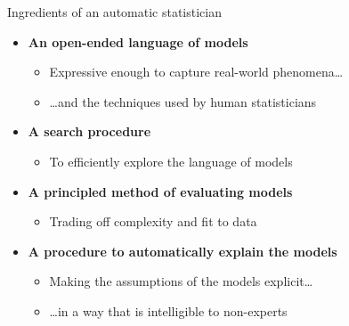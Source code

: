 \begin{frame}{Ingredients of an automatic statistician}
  \begin{center}
    \scalebox{0.5}{}
  \end{center}
  \begin{itemize}
    \footnotesize
    \item {\bf An open-ended language of models}
    \begin{itemize}
       \item Expressive enough to capture real-world phenomena\ldots
       \item \ldots and the techniques used by human statisticians
     \end{itemize}
    \item {\bf A search procedure}
    \begin{itemize}
       \item To efficiently explore the language of models
     \end{itemize}
    \item {\bf A principled method of evaluating models}
    \begin{itemize}
       \item Trading off complexity and fit to data
     \end{itemize}
    \item {\bf A procedure to automatically explain the models}
    \begin{itemize}
       \item Making the assumptions of the models explicit\ldots
       \item \ldots in a way that is intelligible to non-experts
     \end{itemize}
  \end{itemize}
\end{frame}

